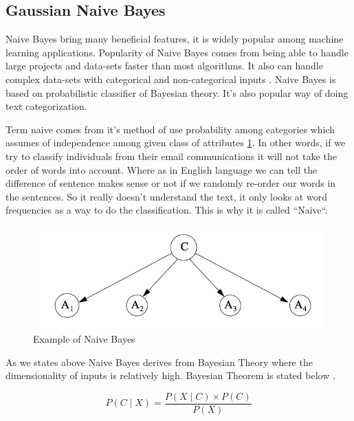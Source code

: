 \documentclass[sigconf]{acmart}
\begin{document}
\subsection{Gaussian Naive Bayes}
Naive Bayes bring many beneficial features, it is widely popular among machine learning applications\cite{tapan-kumar}. Popularity of Naive Bayes comes from being able to handle large projects and data-sets faster than most algorithms\cite{tapan-kumar}. It also can handle complex data-sets with categorical and non-categorical inputs \cite{tapan-kumar}. Naive Bayes is based on probabilistic classifier of Bayesian theory. It's also popular way of doing text categorization\cite{www-wikipedia-naivebayes}. 

\par Term naive comes from it's method of use probability among categories which assumes of independence among given class of attributes \ref{fig:Naive Bayes}. In other words, if we try to classify individuals from their email communications it will not take the order of words into account. Where as in English language we can tell the difference of sentence makes sense or not if we randomly re-order our words in the sentences. So it really doesn't understand the text, it only looks at word frequencies as a way to do the classification. This is why it is called ``Naive``.  

 \begin{figure}[!ht]
    \centering
    \graphicspath{{images/}}
    \includegraphics[width=\columnwidth]{Naive-bayes}
    \caption{Example of Naive Bayes \cite{Zhang}}\label{fig:Naive Bayes}
\end{figure}


\par As we states above Naive Bayes derives from Bayesian Theory where the dimensionality of inputs is relatively high. Bayesian Theorem is stated below \cite{Sayali}.

\begin{equation}
P(C \mid X) = \frac{P(X \mid C) \times P(C)} {P(X)}
\end{equation}
\end{document}
